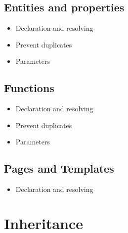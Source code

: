     \subsection{\label{subsec:simple-entities}Entities and properties}

      \begin{itemize}
        \item Declaration and resolving
        \item Prevent duplicates
        \item Parameters
      \end{itemize}

    \subsection{\label{subsec:simple-functions}Functions}

      \begin{itemize}
        \item Declaration and resolving
        \item Prevent duplicates
        \item Parameters
      \end{itemize}

    \subsection{\label{subsec:simple-pages}Pages and Templates}

      \begin{itemize}
        \item Declaration and resolving
      \end{itemize}

  \section{\label{sec:inheritance}Inheritance}

